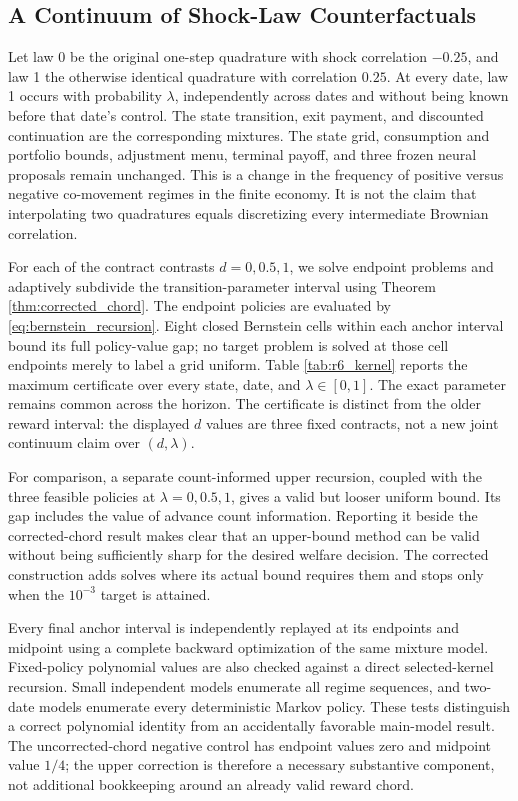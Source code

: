 \subsection{A Continuum of Shock-Law Counterfactuals}
\label{sec:r6_transition_experiment}
Let law 0 be the original one-step quadrature with shock correlation $-0.25$, and law 1 the otherwise identical quadrature with correlation $0.25$. At every date, law 1 occurs with probability $\lambda$, independently across dates and without being known before that date's control. The state transition, exit payment, and discounted continuation are the corresponding mixtures. The state grid, consumption and portfolio bounds, adjustment menu, terminal payoff, and three frozen neural proposals remain unchanged. This is a change in the frequency of positive versus negative co-movement regimes in the finite economy. It is not the claim that interpolating two quadratures equals discretizing every intermediate Brownian correlation.

For each of the contract contrasts $d=0,0.5,1$, we solve endpoint problems and adaptively subdivide the transition-parameter interval using Theorem \ref{thm:corrected_chord}. The endpoint policies are evaluated by \eqref{eq:bernstein_recursion}. Eight closed Bernstein cells within each anchor interval bound its full policy-value gap; no target problem is solved at those cell endpoints merely to label a grid uniform. Table \ref{tab:r6_kernel} reports the maximum certificate over every state, date, and $\lambda\in[0,1]$. The exact parameter remains common across the horizon. The certificate is distinct from the older reward interval: the displayed $d$ values are three fixed contracts, not a new joint continuum claim over $(d,\lambda)$.

For comparison, a separate count-informed upper recursion, coupled with the three feasible policies at $\lambda=0,0.5,1$, gives a valid but looser uniform bound. Its gap includes the value of advance count information. Reporting it beside the corrected-chord result makes clear that an upper-bound method can be valid without being sufficiently sharp for the desired welfare decision. The corrected construction adds solves where its actual bound requires them and stops only when the $10^{-3}$ target is attained.

Every final anchor interval is independently replayed at its endpoints and midpoint using a complete backward optimization of the same mixture model. Fixed-policy polynomial values are also checked against a direct selected-kernel recursion. Small independent models enumerate all regime sequences, and two-date models enumerate every deterministic Markov policy. These tests distinguish a correct polynomial identity from an accidentally favorable main-model result. The uncorrected-chord negative control has endpoint values zero and midpoint value $1/4$; the upper correction is therefore a necessary substantive component, not additional bookkeeping around an already valid reward chord.

